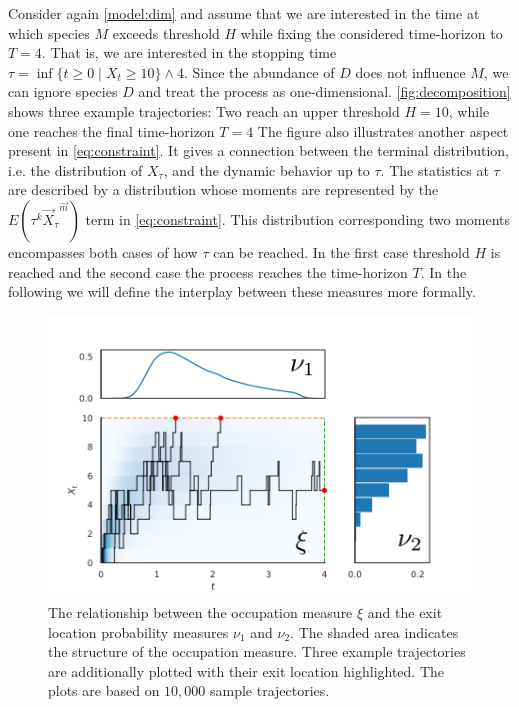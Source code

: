 Consider again \autoref{model:dim} and assume that we are interested in the
time at which species $M$ exceeds  threshold $H$ while fixing the considered time-horizon to
$T=4$. That is, we are interested in the stopping time $\tau=\inf\{t\geq 0\mid X_t\geq 10\}\land 4$.
Since the abundance of $D$ does not influence $M$, we can ignore
species $D$ and treat the process as one-dimensional.
\autoref{fig:decomposition} shows three example trajectories:
Two reach an upper threshold $H=10$, while one reaches the final time-horizon $T=4$
The figure also illustrates another aspect present in \eqref{eq:constraint}.
It gives a connection between the terminal distribution, i.e. the distribution of $X_{\tau}$,
and the dynamic behavior up to $\tau$.
The statistics at $\tau$ are described by a distribution whose %
moments are represented by the $E(\tau^k{\vec{X}_{\tau}}^{\vec{m}})$ term in \eqref{eq:constraint}.
This distribution corresponding two moments encompasses both cases of how
$\tau$ can be reached. In the first case threshold $H$ is reached and the second case the process reaches the time-horizon $T$.
In the following we will define the interplay between these measures more formally.
\begin{figure}[t]
    \centering
    \includegraphics[scale=.8]{gfx/decomp1.pdf}
	\caption[Occupation measure $\xi$ and
	exit location probability measures $\nu_1$ and $\nu_2$]{The relationship between the occupation measure $\xi$ and the
    exit location probability measures $\nu_1$ and $\nu_2$. The shaded area indicates
    the structure of the occupation measure. Three example trajectories are
    additionally plotted with
    their exit location highlighted. The plots are based on $10,\!000$ sample trajectories.}
    \label{fig:decomposition}
\end{figure}


